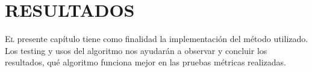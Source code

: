 \doublespacing
\chapter{RESULTADOS}

\lettrine[lines=4, slope=0.2em, findent=0.2em, nindent=0.6em]{E}{l}  presente capítulo tiene como finalidad la implementación del método utilizado. Los testing y usos del algoritmo nos ayudarán a observar y concluir los resultados, qué algoritmo funciona mejor en las pruebas métricas realizadas.   









